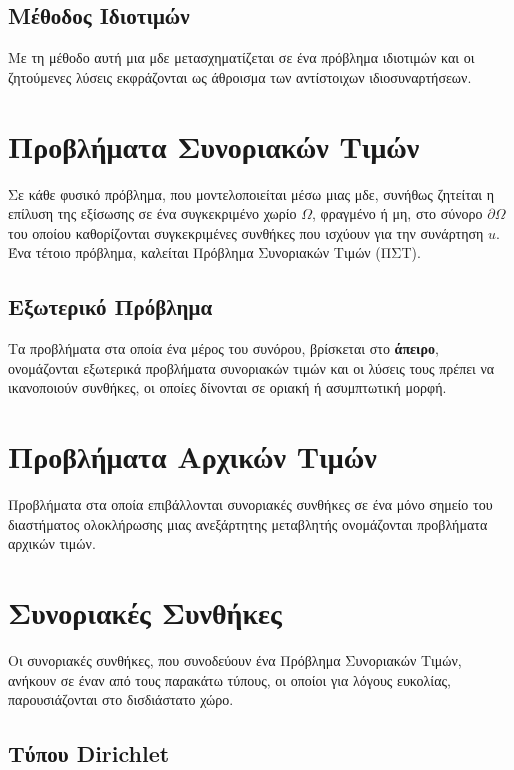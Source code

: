 \subsection*{Μέθοδος Ιδιοτιμών} 

Με τη μέθοδο αυτή μια μδε μετασχηματίζεται σε ένα πρόβλημα 
ιδιοτιμών και οι ζητούμενες λύσεις εκφράζονται ως άθροισμα των αντίστοιχων
ιδιοσυναρτήσεων.


\section*{Προβλήματα Συνοριακών Τιμών}

Σε κάθε φυσικό πρόβλημα, που μοντελοποιείται μέσω μιας μδε, συνήθως ζητείται η επίλυση 
της εξίσωσης σε ένα συγκεκριμένο χωρίο $ \Omega $, φραγμένο ή μη, στο σύνορο $ \partial
\Omega $ του οποίου καθορίζονται συγκεκριμένες συνθήκες που ισχύουν για την 
συνάρτηση $ u $. Ένα τέτοιο πρόβλημα, καλείται \textcolor{Col1}{Πρόβλημα Συνοριακών 
Τιμών} (ΠΣΤ).

\subsection*{Εξωτερικό Πρόβλημα}

Τα προβλήματα στα οποία ένα μέρος του συνόρου, βρίσκεται στο \textbf{άπειρο}, 
ονομάζονται \textcolor{Col1}{εξωτερικά} προβλήματα συνοριακών τιμών και οι λύσεις τους 
πρέπει να ικανοποιούν συνθήκες, οι οποίες δίνονται σε οριακή ή ασυμπτωτική μορφή.

\section*{Προβλήματα Αρχικών Τιμών}

Προβλήματα στα οποία επιβάλλονται συνοριακές συνθήκες σε ένα μόνο σημείο του 
διαστήματος ολοκλήρωσης μιας ανεξάρτητης μεταβλητής ονομάζονται προβλήματα αρχικών 
τιμών.

\section*{Συνοριακές Συνθήκες}

Οι συνοριακές συνθήκες, που συνοδεύουν ένα Πρόβλημα Συνοριακών Τιμών, ανήκουν σε έναν 
από τους παρακάτω τύπους, οι οποίοι για λόγους ευκολίας, παρουσιάζονται στο δισδιάστατο 
χώρο.

\subsection*{Τύπου Dirichlet}

